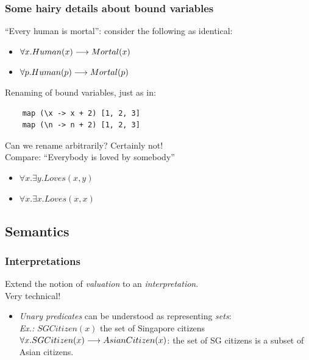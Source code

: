 \documentclass{beamer}
\begin{document}
\begin{frame}[fragile]\frametitle{Some hairy details about bound variables}

  ``Every human is mortal'': consider the following as identical:
  \begin{itemize}
  \item $\forall x. Human(x) \longrightarrow Mortal(x)$
  \item $\forall p. Human(p) \longrightarrow Mortal(p)$
  \end{itemize}

  Renaming of bound variables, just as in:
  \begin{lstlisting}
    map (\x -> x + 2) [1, 2, 3]
    map (\n -> n + 2) [1, 2, 3]
  \end{lstlisting}

  Can we rename arbitrarily? Certainly not!\\
  Compare: ``Everybody is loved by somebody''
  \begin{itemize}
  \item $\forall x. \exists y. Loves(x, y)$
  \item $\forall x. \exists x. Loves(x, x)$
  \end{itemize}

\end{frame}



\subsection{Semantics}

\begin{frame}[fragile]\frametitle{Interpretations}

   Extend the notion of \emph{valuation} to an
  \emph{interpretation}.\\
  Very technical!

  \vspace{5mm}
  \begin{itemize}
  \item \emph{Unary predicates} can be understood as representing \emph{sets}:\\
    \emph{Ex.:} $SGCitizen(x)$ the set of Singapore citizens\\
    $\forall x. SGCitizen(x) \longrightarrow AsianCitizen(x)$: the set of SG citizens is
    a subset of Asian citizens.
  \end{itemize}

\end{frame}
\end{document}
